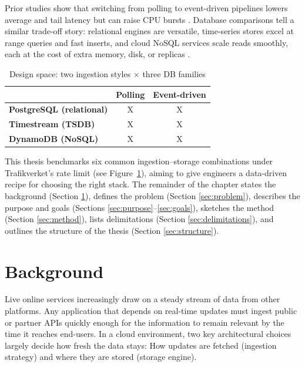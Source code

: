 \documentclass[nomenclature, english, biblatex]{kththesis}
\numberwithin{listing}{chapter}
\begin{document}
\noindent
Prior studies show that switching from polling to event-driven pipelines lowers average and tail latency but can raise CPU bursts \cite{Trindade2021EDAImpact}. 
Database comparisons tell a similar trade-off story: relational engines are versatile, time-series stores excel at range queries and fast inserts, and cloud NoSQL services scale reads smoothly, each at the cost of extra memory, disk, or replicas \cite{Heldt2021SciTS,Grzesik2020EdgeIoTBenchmark,Vergara2021PerformanceTSDB}.

\begin{table}[htbp]
  \centering
  \caption{Design space: two ingestion styles × three DB families}
  \label{tab:design-space}
  \begin{tabular}{lcc}
    \toprule
                     & \textbf{Polling} & \textbf{Event-driven} \\ \midrule
    \textbf{PostgreSQL (relational)} & X & X \\
    \textbf{Timestream (TSDB)}       & X & X \\
    \textbf{DynamoDB (NoSQL)}        & X & X \\ \bottomrule
  \end{tabular}
\end{table}

\noindent
This thesis benchmarks six common ingestion–storage combinations under Trafikverket's rate limit (see Figure~\ref{tab:design-space}), aiming to give engineers a data-driven recipe for choosing the right stack.
The remainder of the chapter states the background (Section \ref{sec:background}), defines the problem (Section \ref{sec:problem}), describes the purpose and goals (Sections \ref{sec:purpose}–\ref{sec:goals}), sketches the method (Section \ref{sec:method}), lists delimitations (Section \ref{sec:delimitations}), and outlines the structure of the thesis (Section \ref{sec:structure}).




\section{Background}
\label{sec:background}
Live online services increasingly draw on a steady stream of data from other platforms. Any application that depends on real-time updates must ingest public or partner \glspl{API} quickly enough for the information to remain relevant by the time it reaches end-users. In a cloud environment, two key architectural choices largely decide how fresh the data stays: How updates are fetched (ingestion strategy) and where they are stored (storage engine).
\end{document}
